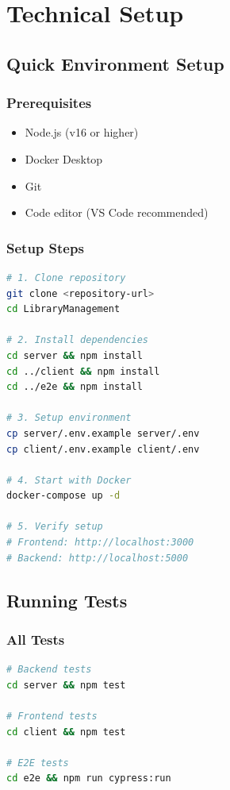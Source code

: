 \documentclass[12pt,a4paper]{article}
\begin{document}
\section{Technical Setup}

\subsection{Quick Environment Setup}

\subsubsection{Prerequisites}
\begin{itemize}[leftmargin=*]
    \item Node.js (v16 or higher)
    \item Docker Desktop
    \item Git
    \item Code editor (VS Code recommended)
\end{itemize}

\subsubsection{Setup Steps}
\begin{lstlisting}[language=bash]
# 1. Clone repository
git clone <repository-url>
cd LibraryManagement

# 2. Install dependencies
cd server && npm install
cd ../client && npm install
cd ../e2e && npm install

# 3. Setup environment
cp server/.env.example server/.env
cp client/.env.example client/.env

# 4. Start with Docker
docker-compose up -d

# 5. Verify setup
# Frontend: http://localhost:3000
# Backend: http://localhost:5000
\end{lstlisting}

\subsection{Running Tests}

\subsubsection{All Tests}
\begin{lstlisting}[language=bash]
# Backend tests
cd server && npm test

# Frontend tests
cd client && npm test

# E2E tests
cd e2e && npm run cypress:run
\end{lstlisting}
\end{document}
